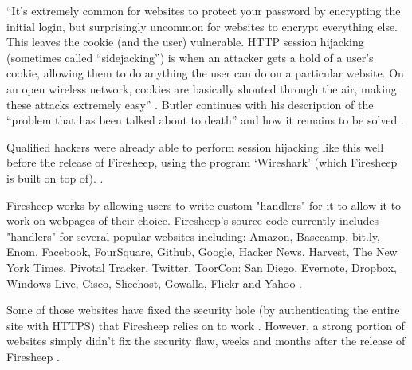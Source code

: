 \documentclass[11pt]{article}
\begin{document}
\begin{multicols}{2}
``It's extremely common for websites to protect your password by encrypting the initial login, but surprisingly uncommon for websites to encrypt everything else. This leaves the cookie (and the user) vulnerable. HTTP session hijacking (sometimes called ``sidejacking'') is when an attacker gets a hold of a user's cookie, allowing them to do anything the user can do on a particular website. On an open wireless network, cookies are basically shouted through the air, making these attacks extremely easy'' \cite{eric-butler}. Butler continues with his description of the ``problem that has been talked about to death'' and how it remains to be solved \cite{eric-butler}. 

Qualified hackers were already able to perform session hijacking like this well before the release of Firesheep, using the program `Wireshark' (which Firesheep is built on top of). \cite{wireshark}.

Firesheep works by allowing users to write custom "handlers" for it to allow it to work on webpages of their choice. Firesheep's source code currently includes "handlers" for several popular websites including: Amazon, Basecamp, bit.ly, Enom, Facebook, FourSquare, Github, Google, Hacker News, Harvest, The New York Times, Pivotal Tracker, Twitter, ToorCon: San Diego, Evernote, Dropbox, Windows Live, Cisco, Slicehost, Gowalla, Flickr and Yahoo \cite{firesheep-source}. 

Some of those websites have fixed the security hole (by authenticating the entire site with HTTPS) that Firesheep relies on to work \cite{butler-fallout}. However, a strong portion of websites simply didn't fix the security flaw, weeks and months after the release of Firesheep \cite{butler-fallout}.







\end{multicols}
\end{document}
